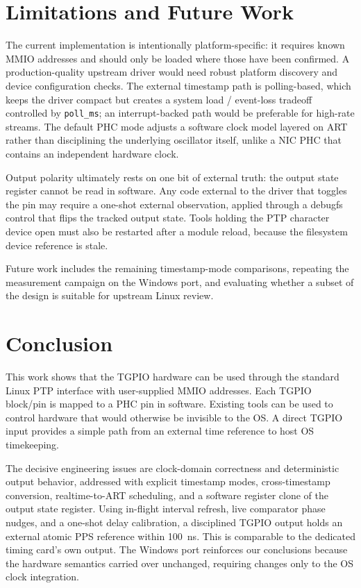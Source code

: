 \documentclass[conference,a4paper]{IEEEtran}
\begin{document}
\section{Limitations and Future Work}\label{sec:limitations-future-work}

The current implementation is intentionally platform-specific: it requires known MMIO addresses and should only be loaded where those have been confirmed. A production-quality upstream driver would need robust platform discovery and device configuration checks. The external timestamp path is polling-based, which keeps the driver compact but creates a system load / event-loss tradeoff controlled by \texttt{poll\_ms}; an interrupt-backed path would be preferable for high-rate streams. The default PHC mode adjusts a software clock model layered on ART rather than disciplining the underlying oscillator itself, unlike a NIC PHC that contains an independent hardware clock.

Output polarity ultimately rests on one bit of external truth: the output state register cannot be read in software. Any code external to the driver that toggles the pin may require a one-shot external observation, applied through a debugfs control that flips the tracked output state. Tools holding the PTP character device open must also be restarted after a module reload, because the filesystem device reference is stale.

Future work includes the remaining timestamp-mode comparisons, repeating the measurement campaign on the Windows port, and evaluating whether a subset of the design is suitable for upstream Linux review.

\section{Conclusion}\label{sec:conclusion}

This work shows that the TGPIO hardware can be used through the standard Linux PTP interface with user-supplied MMIO addresses. Each TGPIO block/pin is mapped to a PHC pin in software. Existing tools can be used to control hardware that would otherwise be invisible to the OS. A direct TGPIO input provides a simple path from an external time reference to host OS timekeeping.

The decisive engineering issues are clock-domain correctness and deterministic output behavior, addressed with explicit timestamp modes, cross-timestamp conversion, realtime-to-ART scheduling, and a software register clone of the output state register. Using in-flight interval refresh, live comparator phase nudges, and a one-shot delay calibration, a disciplined TGPIO output holds an external atomic PPS reference within 100~ns. This is comparable to the dedicated timing card's own output. The Windows port reinforces our conclusions because the hardware semantics carried over unchanged, requiring changes only to the OS clock integration.
\end{document}
